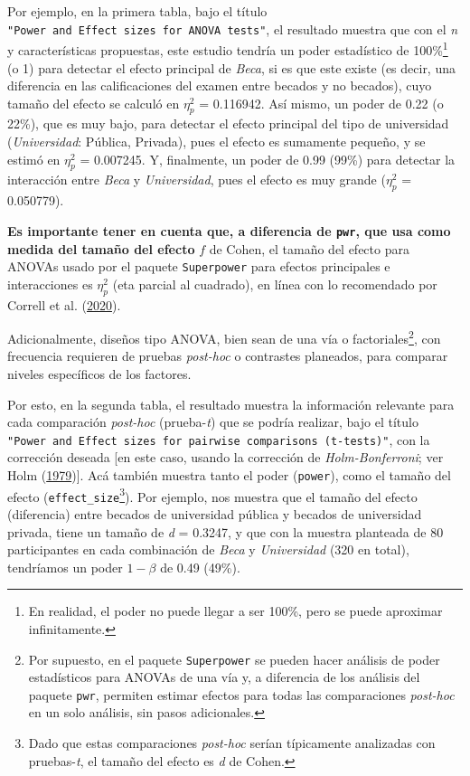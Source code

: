 \documentclass[
]{article}
\begin{document}
Por ejemplo, en la primera tabla, bajo el título
\texttt{"Power\ and\ Effect\ sizes\ for\ ANOVA\ tests"}, el resultado
muestra que con el \emph{n} y características propuestas, este estudio
tendría un poder estadístico de 100\%\footnote{En realidad, el poder no
  puede llegar a ser 100\%, pero se puede aproximar infinitamente.} (o
1) para detectar el efecto principal de \emph{Beca}, si es que este
existe (es decir, una diferencia en las calificaciones del examen entre
becados y no becados), cuyo tamaño del efecto se calculó en \(\eta_p^2\)
= 0.116942. Así mismo, un poder de 0.22 (o 22\%), que es muy bajo, para
detectar el efecto principal del tipo de universidad
(\emph{Universidad}: Pública, Privada), pues el efecto es sumamente
pequeño, y se estimó en \(\eta_p^2\) = 0.007245. Y, finalmente, un poder
de 0.99 (99\%) para detectar la interacción entre \emph{Beca} y
\emph{Universidad}, pues el efecto es muy grande (\(\eta_p^2\) =
0.050779).

\textcolor{red}{\faBookmark} \textbf{Es importante tener en cuenta que,
a diferencia de \texttt{pwr}, que usa como medida del tamaño del efecto}
\(f\) de Cohen, el tamaño del efecto para ANOVAs usado por el paquete
\texttt{Superpower} para efectos principales e interacciones es
\(\eta_p^2\) (eta parcial al cuadrado), en línea con lo recomendado por
Correll et al.
(\protect\hyperlink{ref-correllAvoidCohenSmall2020}{2020}).

Adicionalmente, diseños tipo ANOVA, bien sean de una vía o
factoriales\footnote{Por supuesto, en el paquete \texttt{Superpower} se
  pueden hacer análisis de poder estadísticos para ANOVAs de una vía y,
  a diferencia de los análisis del paquete \texttt{pwr}, permiten
  estimar efectos para todas las comparaciones \emph{post-hoc} en un
  solo análisis, sin pasos adicionales.}, con frecuencia requieren de
pruebas \emph{post-hoc} o contrastes planeados, para comparar niveles
específicos de los factores.

Por esto, en la segunda tabla, el resultado muestra la información
relevante para cada comparación \emph{post-hoc} (prueba-\emph{t}) que se
podría realizar, bajo el título
\texttt{"Power\ and\ Effect\ sizes\ for\ pairwise\ comparisons\ (t-tests)"},
con la corrección deseada {[}en este caso, usando la corrección de
\emph{Holm-Bonferroni}; ver Holm
(\protect\hyperlink{ref-holmSimpleSequentiallyRejective1979a}{1979}){]}.
Acá también muestra tanto el poder (\texttt{power}), como el tamaño del
efecto (\texttt{effect\_size}\footnote{Dado que estas comparaciones
  \emph{post-hoc} serían típicamente analizadas con pruebas-\emph{t}, el
  tamaño del efecto es \emph{d} de Cohen.}). Por ejemplo, nos muestra
que el tamaño del efecto (diferencia) entre becados de universidad
pública y becados de universidad privada, tiene un tamaño de \emph{d} =
0.3247, y que con la muestra planteada de 80 participantes en cada
combinación de \emph{Beca} y \emph{Universidad} (320 en total),
tendríamos un poder \(1-\beta\) de 0.49 (49\%).
\end{document}
